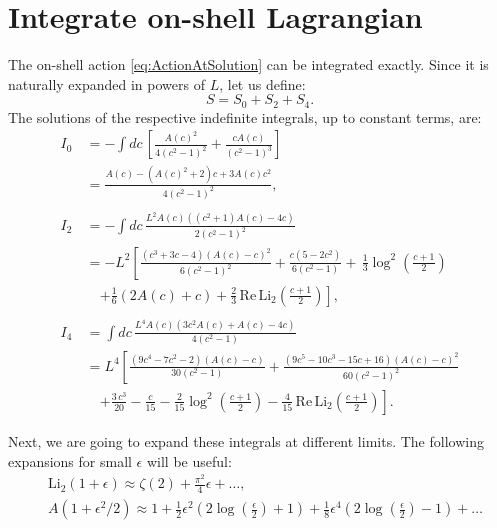 \section{Integrate on-shell Lagrangian}\label{sec:integrate-action}

The on-shell action \eqref{eq:ActionAtSolution} can be integrated exactly. 
Since it is naturally expanded in powers of $L$, let us define:
\begin{equation}
 S = S_0 + S_2 + S_4.
\end{equation}
The solutions of the respective indefinite integrals, up to constant terms, are:
\begin{align}
 I_0 &= - \int dc \,\left[ \frac{A(c)^2}{4 \left(c^2-1\right)^2}+\frac{c A(c)}{\left(c^2-1\right)^3} \right] \nonumber\\
     &=\frac{A(c)-\left(A(c)^2+2\right) c+3 A(c) c^2}{4 \left(c^2-1\right)^2},\label{eq:I0}\\
    \quad\nonumber\\
%     
I_2 &= - \int dc \, \frac{L^2 A(c) \left(\left(c^2+1\right) A(c)-4 c\right)}{2 \left(c^2-1\right)^2}\nonumber\\
    &=-L^2 \left[\frac{\left(c^3+3 c-4\right) (A(c)-c)^2}{6 \left(c^2-1\right)^2} 
      +\frac{c \left(5-2 c^2\right)}{6 \left(c^2-1\right)} + \, \frac{1}{3} \log^2\left(\frac{c+1}{2}\right)\right.\nonumber\\   
 & \quad \left. +\frac{1}{6} \left(2 A(c)+ c\right)
   + \frac{2}{3}  \, \text{Re} \, \text{Li}_2\left(\frac{c+1}{2}\right)\right],\label{eq:I2}\\
   \quad\nonumber\\
%    
 I_4 &=  \int dc\, \frac{L^4 A(c) \left(3 c^2 A(c)+A(c)-4 c\right)}{4 \left(c^2-1\right)} \nonumber\\
 &= L^4 \left[\frac{\left(9 c^4-7 c^2-2\right) (A(c)-c)}{30 \left(c^2-1\right)}+\frac{\left(9 c^5-10 c^3-15 c+16\right) (A(c)-c)^2}{60 \left(c^2-1\right)^2}\right.\nonumber\\
 & \quad \left. + \frac{3 \, c^3}{20}-\frac{c}{15} -\frac{2}{15} \log ^2\left(\frac{c+1}{2}\right) - \frac{4}{15}\, \text{Re} \, \text{Li}_2\left(\frac{c+1}{2}\right) \right]. \label{eq:I4}
\end{align}

Next, we are going to expand these integrals at different limits. The following expansions for small $\epsilon$ will be useful:
\begin{align}
& \text{Li}_2\left(1 + \epsilon \right) \approx  \zeta(2) + \frac{\pi^2}{4} \epsilon + \ldots,\\
& A(1+\epsilon^2/2)\approx 1+\frac{1}{2} \epsilon^2 \left(2 \log \left(\frac{\epsilon}{2}\right)+1\right) 
+ \frac{1}{8} \epsilon^4 \left(2 \log \left(\frac{\epsilon}{2}\right)-1\right)+ \ldots \label{eq:expandA}
\end{align}


